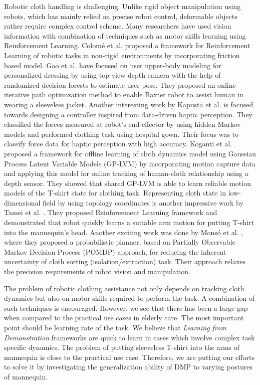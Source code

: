 \documentclass[sigconf]{acmart}
\begin{document}
Robotic cloth handling is challenging. Unlike rigid object manipulation using robots, which has mainly relied on precise robot control, deformable objects rather require complex control scheme. Many researchers have used vision information with combination of techniques such as motor skills learning using Reinforcement Learning. Colom{\'e} et al. \cite{colome2015friction} proposed a framework for Reinforcement Learning of robotic tasks in non-rigid environments by incorporating friction based model. Gao et al. \cite{gao2015user, gao2016iterative} have focused on user upper-body modeling for personalized dressing by using top-view depth camera with the help of randomized decision forests to estimate user pose. They proposed an online iterative path optimization method to enable Baxter robot to assist human in wearing a sleeveless jacket. Another interesting work by Kapusta et al. \cite{kapusta2016data} is focused towards designing a controller inspired from data-driven haptic perception. They classified the forces measured at robot's end-effector by using hidden Markov models and performed clothing task using hospital gown. Their focus was to classify force data for haptic perception with high accuracy. Koganti et al. \cite{koganti2015cloth} proposed a framework for offline learning of cloth dynamics model using Gaussian Process Latent Variable Models (GP-LVM) by incorporating motion capture data and applying this model for online tracking of human-cloth relationship using a depth sensor. They showed that shared GP-LVM is able to learn reliable motion models of the T-shirt state for clothing task. Representing cloth state in low-dimensional field by using topology coordinates is another impressive work by Tamei et al. \cite{tamei2011reinforcement}. They proposed Reinforcement Learning framework and demonstrated that robot quickly learns a suitable arm motion for putting T-shirt into the mannequin's head. Another exciting work was done by Mons{\'o} et al. \cite{monso2012pomdp}, where they proposed a probabilistic planner, based on Partially Observable Markov Decision Process (POMDP) approach, for reducing the inherent uncertainty of cloth sorting (isolation/extraction) task. Their approach relaxes the precision requirements of robot vision and manipulation.

The problem of robotic clothing assistance not only depends on tracking cloth dynamics but also on motor skills required to perform the task. A combination of such techniques is encouraged. However, we see that there has been a large gap when compared to the practical use cases in elderly care. The most important point should be learning rate of the task. We believe that \textit{Learning from Demonstration} frameworks are quick to learn in cases which involve complex task specific dynamics. The problem of putting sleeveless T-shirt into the arms of mannequin is close to the practical use case. Therefore, we are putting our efforts to solve it by investigating the generalization ability of DMP to varying postures of mannequin.
\end{document}
